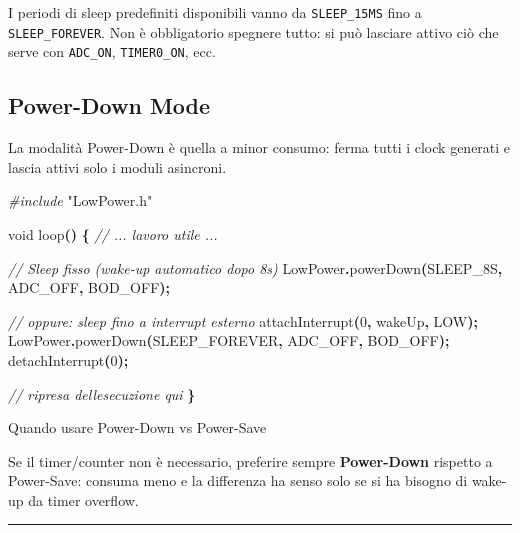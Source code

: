 \documentclass[
  italian,
  openany]{book}
\newenvironment{Shaded}{\begin{snugshade}}{\end{snugshade}}
\newcommand{\CommentTok}[1]{\textcolor[rgb]{0.56,0.35,0.01}{\textit{#1}}}
\newcommand{\DataTypeTok}[1]{\textcolor[rgb]{0.13,0.29,0.53}{#1}}
\newcommand{\DecValTok}[1]{\textcolor[rgb]{0.00,0.00,0.81}{#1}}
\newcommand{\ImportTok}[1]{#1}
\newcommand{\NormalTok}[1]{#1}
\newcommand{\OperatorTok}[1]{\textcolor[rgb]{0.81,0.36,0.00}{\textbf{#1}}}
\newcommand{\PreprocessorTok}[1]{\textcolor[rgb]{0.56,0.35,0.01}{\textit{#1}}}
\begin{document}
I periodi di sleep predefiniti disponibili vanno da \texttt{SLEEP\_15MS}
fino a \texttt{SLEEP\_FOREVER}. Non è obbligatorio spegnere tutto: si
può lasciare attivo ciò che serve con \texttt{ADC\_ON},
\texttt{TIMER0\_ON}, ecc.

\subsection{Power-Down Mode}\label{power-down-mode}

La modalità Power-Down è quella a minor consumo: ferma tutti i clock
generati e lascia attivi solo i moduli asincroni.

\begin{Shaded}
\begin{Highlighting}[]
\PreprocessorTok{\#include }\ImportTok{"LowPower.h"}

\DataTypeTok{void}\NormalTok{ loop}\OperatorTok{()} \OperatorTok{\{}
  \CommentTok{// ... lavoro utile ...}
  
  \CommentTok{// Sleep fisso (wake{-}up automatico dopo 8s)}
\NormalTok{  LowPower}\OperatorTok{.}\NormalTok{powerDown}\OperatorTok{(}\NormalTok{SLEEP\_8S}\OperatorTok{,}\NormalTok{ ADC\_OFF}\OperatorTok{,}\NormalTok{ BOD\_OFF}\OperatorTok{);}
  
  \CommentTok{// oppure: sleep fino a interrupt esterno}
\NormalTok{  attachInterrupt}\OperatorTok{(}\DecValTok{0}\OperatorTok{,}\NormalTok{ wakeUp}\OperatorTok{,}\NormalTok{ LOW}\OperatorTok{);}
\NormalTok{  LowPower}\OperatorTok{.}\NormalTok{powerDown}\OperatorTok{(}\NormalTok{SLEEP\_FOREVER}\OperatorTok{,}\NormalTok{ ADC\_OFF}\OperatorTok{,}\NormalTok{ BOD\_OFF}\OperatorTok{);}
\NormalTok{  detachInterrupt}\OperatorTok{(}\DecValTok{0}\OperatorTok{);}
  
  \CommentTok{// ripresa dell\textquotesingle{}esecuzione qui}
\OperatorTok{\}}
\end{Highlighting}
\end{Shaded}

\begin{callouttip}{Quando usare Power-Down vs Power-Save}

Se il timer/counter non è necessario, preferire sempre
\textbf{Power-Down} rispetto a Power-Save: consuma meno e la differenza
ha senso solo se si ha bisogno di wake-up da timer overflow.

\end{callouttip}

\begin{center}\rule{0.5\linewidth}{0.5pt}\end{center}
\end{document}
